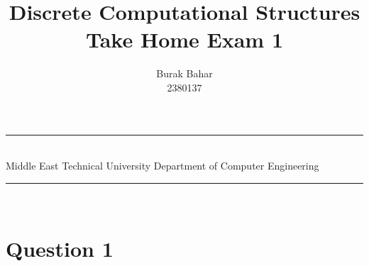 \documentclass[a4paper,12pt]{article}
\title{Discrete Computational Structures \\ Take Home Exam 1}
\author{Burak Bahar \\ 2380137} %
\date{} %
\newcommand{\HRule}{\rule{\linewidth}{1mm}}
\begin{document}
\HRule\\
Middle East Technical University \hfill Department of Computer Engineering
{\let\newpage\relax\maketitle}
\HRule\\
\vspace{1cm}


\section*{Question 1 \hfill {}}
\end{document}
